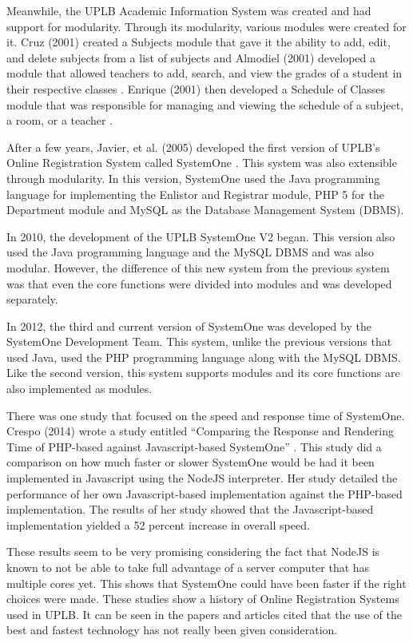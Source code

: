 \documentclass{sigchi}
\begin{document}
Meanwhile, the UPLB Academic Information System was created and had support for
modularity. Through its modularity, various modules were created for it. Cruz (2001) created a
Subjects module that gave it the ability to add, edit, and delete subjects from a list of subjects \cite{cruz} and
Almodiel (2001) developed a module that allowed teachers to add, search, and view the grades of
a student in their respective classes \cite{almodiel}. Enrique (2001) then developed a Schedule of Classes
module that was responsible for managing and viewing the schedule of a subject, a room, or a
teacher \cite{enrique}.

After a few years, Javier, et al. (2005) developed the first version of UPLB’s Online
Registration System called SystemOne \cite{javier}. This system was also extensible through modularity. In
this version, SystemOne used the Java programming language for implementing the Enlistor and
Registrar module, PHP 5 for the Department module and MySQL as the Database Management
System (DBMS).

In 2010, the development of the UPLB SystemOne V2 began. This version also
used the Java programming language and the MySQL DBMS and was also modular. However,
the difference of this new system from the previous system was that even the core functions were
divided into modules and was developed separately.

In 2012, the third and current version of SystemOne was developed by the SystemOne
Development Team. This system, unlike the previous versions that used Java, used the PHP
programming language along with the MySQL DBMS. Like the second version, this system
supports modules and its core functions are also implemented as modules.

There was one study that focused on the speed and response time of SystemOne. Crespo
(2014) wrote a study entitled “Comparing the Response and Rendering Time of PHP-based
against Javascript-based SystemOne” \cite{crespo}. This study did a comparison on how much faster or slower
SystemOne would be had it been implemented in Javascript using the NodeJS interpreter. Her
study detailed the performance of her own Javascript-based implementation against the
PHP-based implementation. The results of her study showed that the Javascript-based
implementation yielded a 52 percent increase in overall speed.

These results seem to be very promising considering the fact that NodeJS is known to not be
able to take full advantage of a server computer that has multiple cores yet. This shows that
SystemOne could have been faster if the right choices were made.
These studies show a history of Online Registration Systems used in UPLB. It can be seen in
the papers and articles cited that the use of the best and fastest technology has not really been
given consideration.
\end{document}
